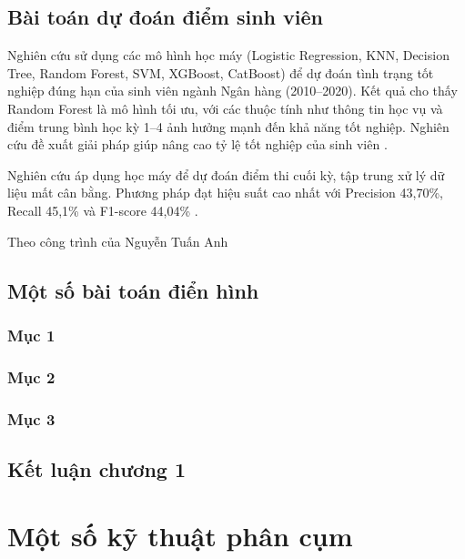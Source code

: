\documentclass[12pt,a4paper,oneside]{report}
\begin{document}
\section{Bài toán dự đoán điểm sinh viên}

Nghiên cứu sử dụng các mô hình học máy (Logistic Regression, KNN,
Decision Tree, Random Forest, SVM, XGBoost, CatBoost) để dự đoán tình
trạng tốt nghiệp đúng hạn của sinh viên ngành Ngân hàng (2010--2020).
Kết quả cho thấy Random Forest là mô hình tối ưu, với các thuộc tính như
thông tin học vụ và điểm trung bình học kỳ 1--4 ảnh hưởng mạnh đến khả
năng tốt nghiệp. Nghiên cứu đề xuất giải pháp giúp nâng cao tỷ lệ tốt
nghiệp của sinh viên \cite{hai2017,thuan2022,thuy2023}.

Nghiên cứu áp dụng học máy để dự đoán điểm thi cuối kỳ, tập trung xử lý
dữ liệu mất cân bằng. Phương pháp đạt hiệu suất cao nhất với Precision
43,70\%, Recall 45,1\% và F1-score 44,04\% \cite{lananh,hai2017,thuan2022,thuy2023}.

Theo công trình của Nguyễn Tuấn Anh \cite{alquraishi2021,tuananh2024}

\section{Một số bài toán điển hình}

\subsection{Mục 1}

\subsection{Mục 2}

\subsection{Mục 3}

\section{Kết luận chương 1}

\chapter{Một số kỹ thuật phân cụm}
\end{document}
